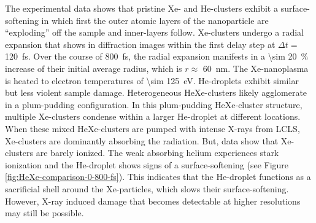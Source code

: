 %
%
The experimental data shows that pristine Xe- and He-clusters exhibit a surface-softening in which first the outer atomic layers of the nanoparticle are ``exploding'' off the sample and inner-layers follow. Xe-clusters undergo a radial expansion that shows in diffraction images within the first delay step at $\Delta t =$ \SI{120}{\femto\second}. Over the course of \SI{800}{\femto\second}, the radial expansion manifests in a \SI{\sim 20}{\percent} increase of their initial average radius, which is $r\approx$ \SI{60}{\nano\meter}. The Xe-nanoplasma is heated to electron temperatures of \SI{\sim 125}{\electronvolt}. He-droplets exhibit similar but less violent sample damage. Heterogeneous HeXe-clusters likely agglomerate in a plum-pudding configuration. In this plum-pudding HeXe-cluster structure, multiple Xe-clusters condense within a larger He-droplet at different locations. When these mixed HeXe-clusters are pumped with intense X-rays from LCLS, Xe-clusters are dominantly absorbing the radiation. But, data show that Xe-clusters are barely ionized. The weak absorbing helium experiences stark ionization and the He-droplet shows signs of a surface-softening (see Figure \ref{fig:HeXe-comparison-0-800-fs}). This indicates that the He-droplet functions as a sacrificial shell around the Xe-particles, which slows their surface-softening. However, X-ray induced damage that becomes detectable at higher resolutions may still be possible.\\[1\baselineskip]
